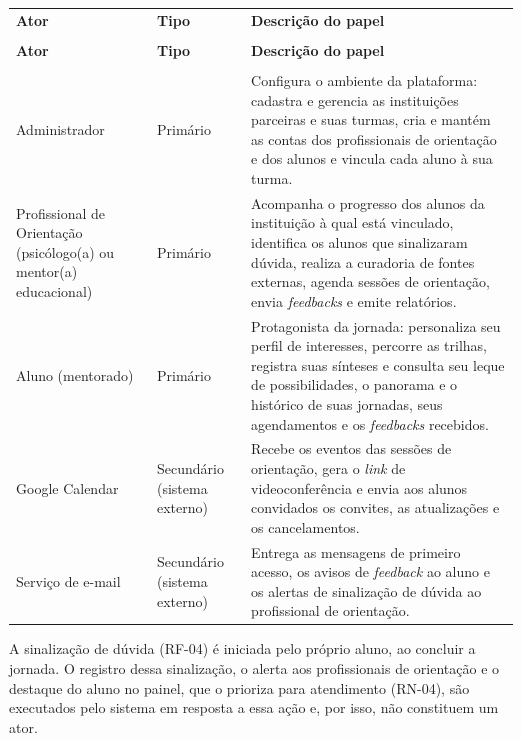 {\ABNTEXfontereduzida
\renewcommand{\arraystretch}{1.25}
\begin{xltabular}{\textwidth}{|>{\raggedright\arraybackslash}p{3.6cm}|>{\raggedright\arraybackslash}p{2.3cm}|>{\raggedright\arraybackslash}X|}
 \\[0.3em]
\hline
\textbf{Ator} & \textbf{Tipo} & \textbf{Descrição do papel} \\
\hline
\endfirsthead
{} \\
\hline
\textbf{Ator} & \textbf{Tipo} & \textbf{Descrição do papel} \\
\hline
\endhead
{} \\
\endfoot
\endlastfoot
Administrador & Primário & Configura o ambiente da plataforma: cadastra e gerencia as instituições parceiras e suas turmas, cria e mantém as contas dos profissionais de orientação e dos alunos e vincula cada aluno à sua turma. \\
\hline
Profissional de Orientação (psicólogo(a) ou mentor(a) educacional) & Primário & Acompanha o progresso dos alunos da instituição à qual está vinculado, identifica os alunos que sinalizaram dúvida, realiza a curadoria de fontes externas, agenda sessões de orientação, envia \textit{feedbacks} e emite relatórios. \\
\hline
Aluno (mentorado) & Primário & Protagonista da jornada: personaliza seu perfil de interesses, percorre as trilhas, registra suas sínteses e consulta seu leque de possibilidades, o panorama e o histórico de suas jornadas, seus agendamentos e os \textit{feedbacks} recebidos. \\
\hline
Google Calendar & Secundário (sistema externo) & Recebe os eventos das sessões de orientação, gera o \textit{link} de videoconferência e envia aos alunos convidados os convites, as atualizações e os cancelamentos. \\
\hline
Serviço de e-mail & Secundário (sistema externo) & Entrega as mensagens de primeiro acesso, os avisos de \textit{feedback} ao aluno e os alertas de sinalização de dúvida ao profissional de orientação. \\
\hline
\end{xltabular}
}

A sinalização de dúvida (RF-04) é iniciada pelo próprio aluno, ao concluir a jornada. O registro dessa sinalização, o alerta aos profissionais de orientação e o destaque do aluno no painel, que o prioriza para atendimento (RN-04), são executados pelo sistema em resposta a essa ação e, por isso, não constituem um ator.

